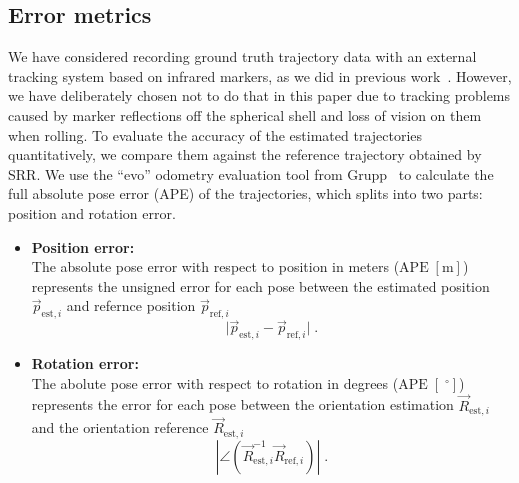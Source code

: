 \subsection{Error metrics}

We have considered recording ground truth trajectory data with an external tracking system based on infrared markers, as we did in previous work~\cite{10256359}.
However, we have deliberately chosen not to do that in this paper due to tracking problems caused by marker reflections off the spherical shell and loss of vision on them when rolling.
To evaluate the accuracy of the estimated trajectories quantitatively, we compare them against the reference trajectory obtained by SRR.
We use the ``evo'' odometry evaluation tool from Grupp~\cite{grupp2017evo} to calculate the full absolute pose error (APE) of the trajectories, which splits into two parts: position and rotation error.
\begin{itemize}
  \item \textbf{Position error:}\\
  The absolute pose error with respect to position in meters ($\mathrm{APE\;[m]}$) represents the unsigned error for each pose between the estimated position $\vec{p}_{\mathrm{est},i}$ and refernce position $\vec{p}_{\mathrm{ref},i}$
  \begin{equation}
      \lvert \vec{p}_{\mathrm{est},i} - \vec{p}_{\mathrm{ref},i} \rvert \;.
      \label{eq:ape}
  \end{equation}

  \item \textbf{Rotation error:}\\
  The abolute pose error with respect to rotation in degrees ($\mathrm{APE\;[\phantom{.}^{\circ}]}$) represents the error for each pose between the orientation estimation $\vec{R}_{\mathrm{est},i}$ and the orientation reference $\vec{R}_{\mathrm{est},i}$
  \begin{equation}
      \left| \angle \left( \vec{R}_{\mathrm{est},i}^{-1} \vec{R}_{\mathrm{ref},i} \right)\right| \;.
      \label{eq:rpe}
  \end{equation}
\end{itemize}

